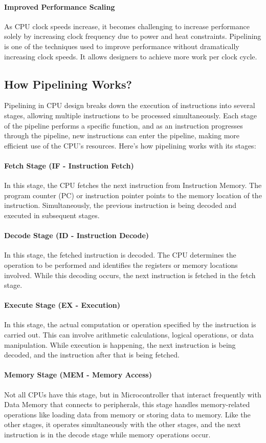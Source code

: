 \paragraph*{Improved Performance Scaling}
As CPU clock speeds increase, it becomes challenging to increase performance solely by increasing clock frequency due to power and heat constraints.
Pipelining is one of the techniques used to improve performance without dramatically increasing clock speeds.
It allows designers to achieve more work per clock cycle.
\subsection{How Pipelining Works?}
Pipelining in CPU design breaks down the execution of instructions into several stages, allowing multiple instructions to be processed simultaneously.
Each stage of the pipeline performs a specific function, and as an instruction progresses through the pipeline, new instructions can enter the pipeline,
making more efficient use of the CPU's resources. Here's how pipelining works with its stages:
\paragraph*{Fetch Stage (IF - Instruction Fetch)}
In this stage, the CPU fetches the next instruction from Instruction Memory.
The program counter (PC) or instruction pointer points to the memory location of the instruction.
Simultaneously, the previous instruction is being decoded and executed in subsequent stages.
\paragraph*{Decode Stage (ID - Instruction Decode)}
In this stage, the fetched instruction is decoded.
The CPU determines the operation to be performed and identifies the registers or memory locations involved.
While this decoding occurs, the next instruction is fetched in the fetch stage.
\paragraph*{Execute Stage (EX - Execution)}
In this stage, the actual computation or operation specified by the instruction is carried out.
This can involve arithmetic calculations, logical operations, or data manipulation.
While execution is happening, the next instruction is being decoded, and the instruction after that is being fetched.
\paragraph*{Memory Stage (MEM - Memory Access)}
Not all CPUs have this stage, but in Microcontroller that interact frequently with Data Memory that connects to peripherals,
this stage handles memory-related operations like loading data from memory or storing data to memory.
Like the other stages, it operates simultaneously with the other stages, and the next instruction is in the decode stage while memory operations occur.

